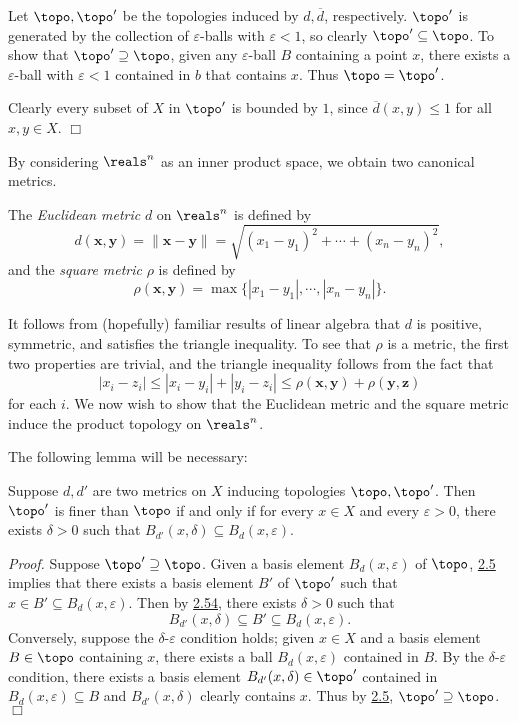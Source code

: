 Let $\topo, \topo'$ be the topologies induced by $d, \overline{d}$, respectively. $\topo'$ is generated by the collection of $\varepsilon$-balls with $\varepsilon < 1$, so clearly $\topo' \subseteq \topo$. To show that $\topo' \supseteq \topo$, given any $\varepsilon$-ball $B$ containing a point $x$, there exists a $\varepsilon$-ball with $\varepsilon < 1$ contained in $b$ that contains $x$. Thus $\topo = \topo'$.

Clearly every subset of $X$ in $\topo'$ is bounded by $1$, since $\overline{d}(x, y) \leq 1$ for all $x, y \in X$. $\Box$

By considering $\reals^n$ as an inner product space, we obtain two canonical metrics.
\begin{definition}\label{2.58}
    The {\it Euclidean metric} $d$ on $\reals^n$ is defined by
    $$d(\mathbf{x}, \mathbf{y}) = \|\mathbf{x} - \mathbf{y}\| = \sqrt{(x_1-y_1)^2 + \cdots + (x_n-y_n)^2},$$
    and the {\it square metric} $\rho$ is defined by
    $$\rho(\mathbf{x}, \mathbf{y}) = \max \{|x_1-y_1|, \cdots, |x_n-y_n|\}.$$
\end{definition}
It follows from (hopefully) familiar results of linear algebra that $d$ is positive, symmetric, and satisfies the triangle inequality. To see that $\rho$ is a metric, the first two properties are trivial, and the triangle inequality follows from the fact that
$$|x_i-z_i|\leq |x_i-y_i|+|y_i-z_i| \leq \rho(\mathbf{x}, \mathbf{y}) + \rho(\mathbf{y}, \mathbf{z})$$
for each $i$. We now wish to show that the Euclidean metric and the square metric induce the product topology on $\reals^n$.

The following lemma will be necessary:
\begin{lemma}\label{2.59}
    Suppose $d, d'$ are two metrics on $X$ inducing topologies $\topo, \topo'$. Then $\topo'$ is finer than $\topo$ if and only if for every $x \in X$ and every $\varepsilon > 0$, there exists $\delta > 0$ such that $B_{d'}(x, \delta) \subseteq B_d(x, \varepsilon).$
\end{lemma}
{\it Proof.} Suppose $\topo' \supseteq \topo$. Given a basis element $B_d(x, \varepsilon)$ of $\topo$, \hyperref[2.5]{2.5} implies that there exists a basis element $B'$ of $\topo'$ such that $x \in B' \subseteq B_d(x, \varepsilon)$. Then by \hyperref[2.54]{2.54}, there exists $\delta > 0$ such that
$$B_{d'}(x, \delta) \subseteq B' \subseteq B_d(x, \varepsilon).$$
Conversely, suppose the $\delta$-$\varepsilon$ condition holds; given $x \in X$ and a basis element $B \in \topo$ containing $x$, there exists a ball $B_d(x, \varepsilon)$ contained in $B$. By the $\delta$-$\varepsilon$ condition, there exists a basis element $B_{d'}(x, \delta) \in \topo'$ contained in $B_d(x, \varepsilon) \subseteq B$ and $B_{d'}(x, \delta)$ clearly contains $x$. Thus by \hyperref[2.5]{2.5}, $\topo' \supseteq \topo$. $\Box$

